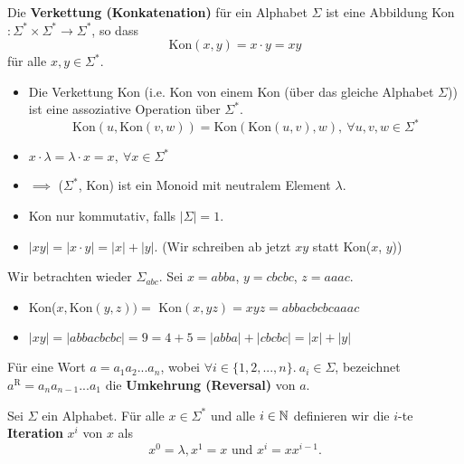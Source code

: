 	
	\begin{mainbox}{}
		Die \textbf{Verkettung (Konkatenation)} für ein Alphabet $\Sigma$ ist eine Abbildung Kon$: \Sigma^* \times \Sigma^* \to \Sigma^*$, so dass 
		$$\text{Kon}(x, y) = x \cdot y = xy$$
		für alle $x, y \in \Sigma^*$.
	\end{mainbox}
	
	\begin{itemize}[label=-]
		\item Die Verkettung Kon (i.e. Kon von einem Kon (über das gleiche Alphabet $\Sigma$)) ist eine assoziative Operation über $\Sigma^*$.
		$$\text{Kon}(u, \text{Kon}(v, w)) = \text{Kon}(\text{Kon}(u, v), w), \ \forall u,v,w \in \Sigma^*$$
		\item $x\cdot \lambda = \lambda \cdot x = x, \ \forall x \in \Sigma^*$
		\item $\implies$ ($\Sigma^*$, Kon) ist ein Monoid mit neutralem Element $\lambda$.
		\item Kon nur kommutativ, falls $|\Sigma| = 1$.
		\item $|xy|=|x\cdot y| = |x|+|y|$. (Wir schreiben ab jetzt $xy$ statt Kon($x$, $y$))
	\end{itemize}




	Wir betrachten wieder $\Sigma_{abc}$. Sei $x = abba$, $y = cbcbc$, $z = aaac$.
	\begin{itemize}[label=-]
		\item Kon($x, \text{Kon}(y, z)) = $  $\text{Kon}(x, yz) = xyz = abbacbcbcaaac$
		\item $|xy| =$$ |abbacbcbc| = 9 = 4 + 5 = |abba| + |cbcbc| = |x| + |y|$
	\end{itemize}
	

	



	
	\begin{mainbox}{}
		Für eine Wort $a = a_1a_2...a_n$, wobei $\forall i \in \{1,2, ..., n\}. \ a_i \in \Sigma$, 
		bezeichnet $a^\text{R} = a_na_{n-1}...a_1$ die \textbf{Umkehrung (Reversal)} von $a$.
	\end{mainbox}
	
	\begin{mainbox}{}
		Sei $\Sigma$ ein Alphabet. Für alle $x \in \Sigma^*$ und alle $i \in \mathbb{N}$ definieren wir die $i$-te \textbf{Iteration} $x^i$ von $x$ als 
		$$x^0 = \lambda, x^1 = x \text{ und } x^i = xx^{i-1}.$$
	\end{mainbox}



